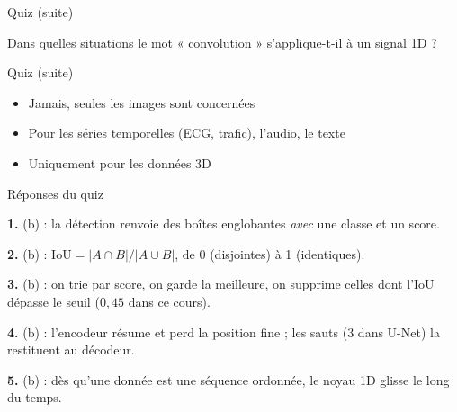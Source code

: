 \begin{frame}{Quiz (suite)}
\begin{qbox}[Question 5]
Dans quelles situations le mot « convolution » s'applique-t-il à un signal 1D ?

\end{qbox}
\end{frame}
\begin{frame}{Quiz (suite)}
\begin{itemize}
  \item[(a)] Jamais, seules les images sont concernées
  \item[(b)] Pour les séries temporelles (ECG, trafic), l'audio, le texte
  \item[(c)] Uniquement pour les données 3D
\end{itemize}
\end{frame}

\begin{frame}{Réponses du quiz}
\begin{solbox}
\textbf{1.} (b) : la détection renvoie des boîtes englobantes \emph{avec} une
classe et un score.\par
\textbf{2.} (b) : $\mathrm{IoU} = |A \cap B| / |A \cup B|$, de 0 (disjointes)
à 1 (identiques).\par
\textbf{3.} (b) : on trie par score, on garde la meilleure, on supprime celles
dont l'IoU dépasse le seuil ($0{,}45$ dans ce cours).\par
\textbf{4.} (b) : l'encodeur résume et perd la position fine ; les sauts
(3 dans U-Net) la restituent au décodeur.\par
\textbf{5.} (b) : dès qu'une donnée est une séquence ordonnée, le noyau 1D
glisse le long du temps.
\end{solbox}
\end{frame}

